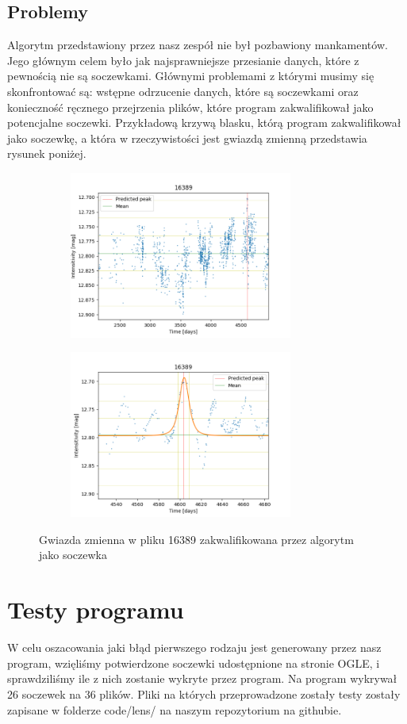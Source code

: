 \documentclass[a4paper,11pt]{article}
\newcommand{\ak}{\hspace{0.7 cm}}
\begin{document}
\subsection{Problemy}
Algorytm przedstawiony przez nasz zespół nie był pozbawiony mankamentów. Jego głównym celem było jak najsprawniejsze przesianie danych, które z pewnością nie są soczewkami. Głównymi problemami z którymi musimy się skonfrontować są: wstępne odrzucenie danych, które są soczewkami oraz konieczność ręcznego przejrzenia plików, które program zakwalifikował jako potencjalne soczewki. Przykładową krzywą blasku, którą program zakwalifikował jako soczewkę, a która w rzeczywistości jest gwiazdą zmienną przedstawia rysunek poniżej.
\begin{figure}[H]
\begin{subfigure}{0.5\textwidth}
\centering
\includegraphics[width=\linewidth,height=5.5cm]{16389.png}
\label{Fig_10}
\end{subfigure}
\hspace{0.25cm}
\begin{subfigure}{0.5\textwidth}
\centering
\includegraphics[width=\linewidth,height=5.5cm]{16389_v.png}
\label{Fig_11}
\end{subfigure}
\caption{Gwiazda zmienna w pliku 16389 zakwalifikowana przez algorytm jako soczewka}
\end{figure}
\section{Testy programu}
\ak W celu oszacowania jaki błąd pierwszego rodzaju jest generowany przez nasz program, wzięliśmy potwierdzone soczewki udostępnione na stronie OGLE, i sprawdziliśmy ile z nich zostanie wykryte przez program. Na program wykrywał 26 soczewek na 36 plików. Pliki na których przeprowadzone zostały testy zostały zapisane w folderze code/lens/ na naszym repozytorium na githubie.
\end{document}
